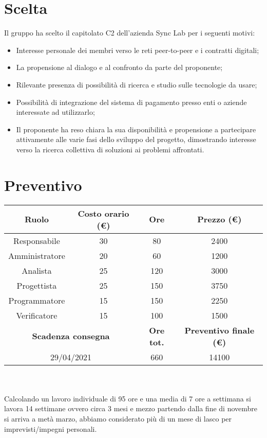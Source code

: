\documentclass[a4paper, 12pt]{article}
\begin{document}
\makefrontpage


\section{Scelta}\label{scelta}
Il gruppo ha scelto il capitolato C2 dell’azienda Sync Lab per i seguenti motivi:
\begin{itemize}
\item Interesse personale dei membri verso le reti peer-to-peer e i contratti digitali;
\item La propensione al dialogo e al confronto da parte del proponente;
\item Rilevante presenza di possibilità di ricerca e studio sulle tecnologie da usare;
\item Possibilità di integrazione del sistema di pagamento presso enti o aziende interessate ad utilizzarlo;
\item Il proponente ha reso chiara la sua disponibilità e propensione a partecipare attivamente alle varie fasi dello sviluppo del progetto, dimostrando interesse verso la ricerca collettiva di soluzioni ai problemi affrontati.
\end{itemize}

\section{Preventivo}\label{preventivo}
\begin{tabular}{|c|c|c|c|}
    \hline
    \textbf{Ruolo} & \textbf{Costo orario (€)} & \textbf{Ore} & \textbf{Prezzo (€)}\\
    \hline
    Responsabile & 30 & 80 & 2400\\
    \hline
    Amministratore & 20 & 60 & 1200\\
    \hline
    Analista & 25 & 120 & 3000\\
    \hline
    Progettista & 25 & 150 & 3750\\
    \hline
    Programmatore & 15 & 150 & 2250\\
    \hline
    Verificatore & 15 & 100 & 1500\\
    \hline\hline
    \multicolumn{2}{|c|}{\textbf{Scadenza consegna}} & \textbf{Ore tot.} & \textbf{Preventivo finale (€)}\\
    \hline
    \multicolumn{2}{|c|}{29/04/2021} & 660 & 14100\\
    \hline
\end{tabular}\\\\

Calcolando un lavoro individuale di 95 ore e una media di 7 ore a settimana
si lavora 14 settimane ovvero circa 3 mesi e mezzo partendo dalla fine di novembre
si arriva a metà marzo, abbiamo considerato più di un mese di lasco per imprevisti/impegni personali.
\end{document}
